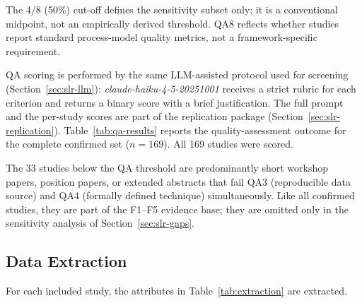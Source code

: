 The $4/8$ (50\%) cut-off defines the sensitivity subset only; it is a
conventional midpoint, not an empirically derived threshold. QA8 reflects
whether studies report standard process-model quality metrics, not a
framework-specific requirement.

QA scoring is performed by the same LLM-assisted protocol used for screening
(Section~\ref{sec:slr-llm}): \textit{claude-haiku-4-5-20251001} receives a
strict rubric for each criterion and returns a binary score with a brief
justification. The full prompt and the per-study scores are part of the
replication package (Section~\ref{sec:slr-replication}).
Table~\ref{tab:qa-results} reports the quality-assessment outcome for the
complete confirmed set ($n = 169$). All 169 studies were scored.



The 33 studies below the QA threshold are predominantly short workshop papers,
position papers, or extended abstracts that fail QA3 (reproducible data
source) and QA4 (formally defined technique) simultaneously. Like all
confirmed studies, they are part of the F1--F5 evidence base; they are
omitted only in the sensitivity analysis of Section~\ref{sec:slr-gaps}.


\subsection{Data Extraction}
\label{sec:slr-extraction}

For each included study, the attributes in Table~\ref{tab:extraction} are
extracted.

